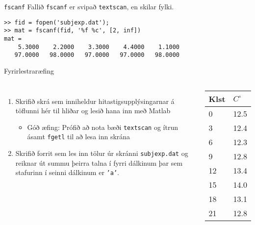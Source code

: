 \documentclass[handout]{beamer}
\begin{document}
\begin{frame}[fragile]{\texttt{fscanf}}
Fallið \texttt{fscanf} er svipað \texttt{textscan}, en skilar fylki.

\begin{verbatim}
>> fid = fopen('subjexp.dat');
>> mat = fscanf(fid, '%f %c', [2, inf])
mat =
    5.3000    2.2000    3.3000    4.4000    1.1000
   97.0000   98.0000   97.0000   97.0000   98.0000
\end{verbatim}


\end{frame}

\begin{frame}[fragile]{Fyrirlestraræfing}
\begin{columns}
\begin{enumerate}
    \item Skrifið skrá sem inniheldur hitastigsupplýsingarnar á töflunni hér til hliðar og lesið hana inn með Matlab
    \begin{itemize}
        \item Góð æfing: Prófið að nota bæði \texttt{textscan} og ítrun ásamt \texttt{fgetl} til að lesa inn skrána
    \end{itemize}
    \item Skrifið forrit sem les inn tölur úr skránni \texttt{subjexp.dat} og reiknar út summu þeirra talna í fyrri dálkinum þar sem stafurinn í seinni dálkinum er \texttt{'a'}.
\end{enumerate}
\begin{center}
\begin{tabular}{ll}
\toprule
Klst&$C^\circ$\\
\midrule
0&12.5\\
3&12.4\\
6&12.3\\
9&12.8\\
12&13.4\\
15&14.0\\
18&13.1\\
21&12.8\\
\bottomrule
\end{tabular}
\end{center}
\end{columns}
\end{frame}
\end{document}
